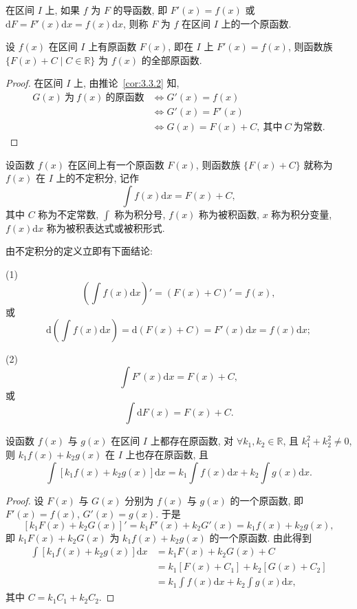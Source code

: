 \begin{definition}\label{def:5.1.2}
在区间 $I$ 上, 如果 $f$ 为 $F$ 的导函数, 即 $F'(x)=f(x)$ 或 $\mathrm{d}F=F'(x)\mathrm{d}x=f(x)\mathrm{d}x$, 则称 $F$ 为 $f$ 在区间 $I$ 上的一个原函数.
\end{definition}

\begin{theorem}\label{thm:5.1.2}
设 $f(x)$ 在区间 $I$ 上有原函数 $F(x)$, 即在 $I$ 上 $F'(x)=f(x)$, 则函数族 $\{F(x)+C\mid C\in\mathbb{R}\}$ 为 $f(x)$ 的全部原函数.
\end{theorem}

\begin{proof}
在区间 $I$ 上, 由推论~\ref{cor:3.3.2} 知,
\begin{align*}
G(x)\ \text{为}\ f(x)\ \text{的原函数}
&\Longleftrightarrow G'(x)=f(x)\\
&\Longleftrightarrow G'(x)=F'(x)\\
&\Longleftrightarrow G(x)=F(x)+C,\ \text{其中}\ C\ \text{为常数}.
\end{align*}
\end{proof}

\begin{definition}\label{def:5.1.3}
设函数 $f(x)$ 在区间上有一个原函数 $F(x)$, 则函数族 $\{F(x)+C\}$ 就称为 $f(x)$ 在 $I$ 上的不定积分, 记作
\[
\int f(x)\mathrm{d}x=F(x)+C,
\]
其中 $C$ 称为不定常数, $\int$ 称为积分号, $f(x)$ 称为被积函数, $x$ 称为积分变量, $f(x)\mathrm{d}x$ 称为被积表达式或被积形式.
\end{definition}

由不定积分的定义立即有下面结论:

(1)
\[
\left(\int f(x)\mathrm{d}x\right)'=\left(F(x)+C\right)'=f(x),
\]
或
\[
\mathrm{d}\left(\int f(x)\mathrm{d}x\right)=\mathrm{d}(F(x)+C)=F'(x)\mathrm{d}x=f(x)\mathrm{d}x;
\]

(2)
\[
\int F'(x)\mathrm{d}x=F(x)+C,
\]
或
\[
\int\mathrm{d}F(x)=F(x)+C.
\]

\begin{theorem}\label{thm:5.1.3}
设函数 $f(x)$ 与 $g(x)$ 在区间 $I$ 上都存在原函数, 对 $\forall k_{1},k_{2}\in\mathbb{R}$, 且 $k_{1}^{2}+k_{2}^{2}\neq 0$, 则 $k_{1}f(x)+k_{2}g(x)$ 在 $I$ 上也存在原函数, 且
\[
\int\left[k_{1}f(x)+k_{2}g(x)\right]\mathrm{d}x
=k_{1}\int f(x)\mathrm{d}x+k_{2}\int g(x)\mathrm{d}x.
\]
\end{theorem}

\begin{proof}
设 $F(x)$ 与 $G(x)$ 分别为 $f(x)$ 与 $g(x)$ 的一个原函数, 即 $F'(x)=f(x)$, $G'(x)=g(x)$. 于是
\[
\left[k_{1}F(x)+k_{2}G(x)\right]'=k_{1}F'(x)+k_{2}G'(x)=k_{1}f(x)+k_{2}g(x),
\]
即 $k_{1}F(x)+k_{2}G(x)$ 为 $k_{1}f(x)+k_{2}g(x)$ 的一个原函数. 由此得到
\begin{align*}
\int\left[k_{1}f(x)+k_{2}g(x)\right]\mathrm{d}x
&=k_{1}F(x)+k_{2}G(x)+C\\
&=k_{1}\left[F(x)+C_{1}\right]+k_{2}\left[G(x)+C_{2}\right]\\
&=k_{1}\int f(x)\mathrm{d}x+k_{2}\int g(x)\mathrm{d}x,
\end{align*}
其中 $C=k_{1}C_{1}+k_{2}C_{2}$.
\end{proof}

